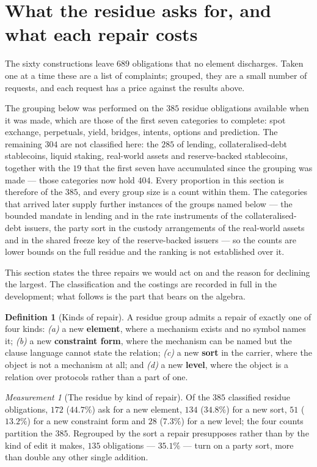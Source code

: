 \documentclass[11pt,reqno]{amsart}
\theoremstyle{plain}
\theoremstyle{definition}
\newtheorem{definition}[theorem]{Definition}
\theoremstyle{remark}
\newtheorem{measurement}[theorem]{Measurement}
\begin{document}
\section{What the residue asks for, and what each repair costs}\label{sec:extend}

The sixty constructions leave $689$ obligations that no element discharges.
Taken one at a time these are a list of complaints; grouped, they are a small
number of requests, and each request has a price against the results above.

The grouping below was performed on the $385$ residue obligations available when
it was made, which are those of the first seven categories to complete: spot
exchange, perpetuals, yield, bridges, intents, options and prediction. The
remaining $304$ are not classified here: the $285$ of lending,
collateralised-debt stablecoins, liquid staking, real-world assets and
reserve-backed stablecoins, together with the $19$ that the first seven have
accumulated since the grouping was made --- those categories now hold $404$.
Every proportion in this section is therefore of the $385$, and every group size
is a count within them. The categories that arrived later
supply further instances of the groups named below --- the bounded mandate in
lending and in the rate instruments of the collateralised-debt issuers, the
party sort in the custody arrangements of the real-world assets and in the
shared freeze key of the reserve-backed issuers --- so the counts are lower
bounds on the full residue and the ranking is not established over it.

This section states the three repairs we would act on and the reason for
declining the largest. The classification and the costings are recorded in full
in the development; what follows is the part that bears on the algebra.

\begin{definition}[Kinds of repair]\label{def:repairkind}
A residue group admits a repair of exactly one of four kinds:
\emph{(a)} a new \textbf{element}, where a mechanism exists and no symbol names
it; \emph{(b)} a new \textbf{constraint form}, where the mechanism can be named
but the clause language cannot state the relation; \emph{(c)} a new \textbf{sort}
in the carrier, where the object is not a mechanism at all; and \emph{(d)} a new
\textbf{level}, where the object is a relation over protocols rather than a part
of one.
\end{definition}

\begin{measurement}[The residue by kind of repair]\label{meas:kinds}
Of the $385$ classified residue obligations, $172$ ($44.7\%$) ask for a new
element, $134$ ($34.8\%$) for a new sort, $51$ ($13.2\%$) for a new constraint
form and $28$ ($7.3\%$) for a new level; the four counts partition the $385$.
Regrouped by the sort a repair presupposes rather than by the kind of edit it
makes, $135$ obligations --- $35.1\%$ --- turn on a party sort, more than double
any other single addition.
\end{measurement}
\end{document}
